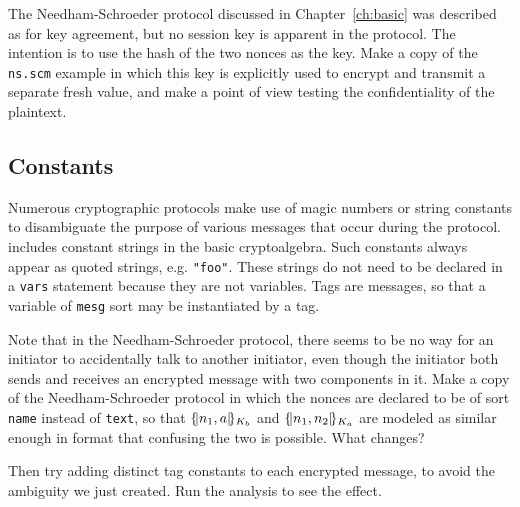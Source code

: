 \begin{exercise}
  The Needham-Schroeder protocol discussed in Chapter~\ref{ch:basic}
  was described as for key agreement, but no session key is apparent
  in the protocol.  The intention is to use the hash of the two nonces
  as the key.  Make a copy of the \texttt{ns.scm} example in which
  this key is explicitly used to encrypt and transmit a separate fresh
  value, and make a point of view testing the confidentiality of the
  plaintext.
\end{exercise}

\subsection{Constants}
   Numerous cryptographic
protocols make use of magic numbers or string constants to
disambiguate the purpose of various messages that occur during the
protocol.  {\cpsa} includes constant strings in the basic
cryptoalgebra.  Such constants always appear as quoted strings,
e.g. \texttt{"foo"}.  These strings do not need to be declared in a
\texttt{vars} statement because they are not variables.  Tags are
messages, so that a variable of
\verb|mesg| sort may be instantiated by a tag.


\begin{exercise}
Note that in the Needham-Schroeder protocol, there seems to be no way
for an initiator to accidentally talk to another initiator, even though
the initiator both sends and receives an encrypted message with two
components in it.  Make a copy of the Needham-Schroeder protocol in which
the nonces are declared to be of sort \texttt{name} instead of \texttt{text},
so that $\{\!|n_1,a|\!\}_{K_b}$ and $\{\!|n_1,n_2|\!\}_{K_a}$ are modeled as similar
enough in format that confusing the two is possible.  What changes?

Then try adding distinct tag constants to each encrypted message, to
avoid the ambiguity we just created.  Run the analysis to see the
effect.
\end{exercise}

